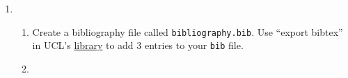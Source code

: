 \begin{enumerate}
    \item \begin{enumerate}
        \item 
            Create a bibliography file called \texttt{bibliography.bib}. Use ``export bibtex'' in UCL's \href{https://ucl-new-primo.hosted.exlibrisgroup.com/primo-explore/search?vid=UCL_VU2}{library} to add 3 entries to your \texttt{bib} file.
        \item 
            
    \end{enumerate} 
\end{enumerate}